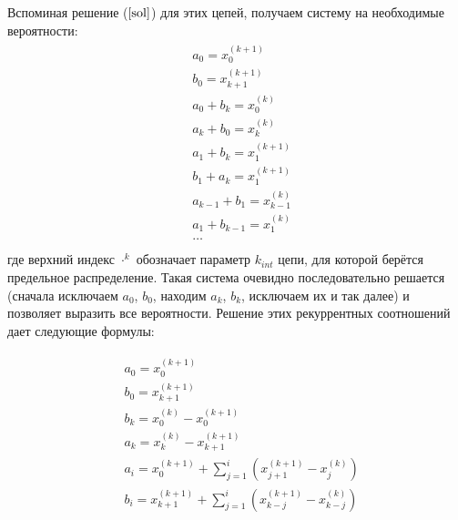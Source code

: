 Вспоминая решение ($\ref{sol}$) для этих цепей, получаем систему на необходимые вероятности:
\begin{align}
	\begin{split}
	\label{general}
	&a_0 = x^{(k+1)}_0\\
	&b_0 = x^{(k+1)}_{k+1}\\
	&a_0 + b_{k}= x^{(k)}_0\\
	&a_k + b_0 = x^{(k)}_k \\
	&a_1 + b_k = x^{(k+1)}_1\\
	&b_1 + a_k = x^{(k+1)}_1\\
	&a_{k-1} + b_1 = x^{(k)}_{k-1}\\
	&a_1+ b_{k-1} = x^{(k)}_{1}\\
	&\dots \\
	\end{split}
\end{align}
где верхний индекс $\cdot^k$ обозначает параметр $k_{int}$ цепи, для которой берётся предельное распределение. Такая система очевидно последовательно решается (сначала исключаем $a_0$, $b_0$, находим $a_k$, $b_k$, исключаем их и так далее) и позволяет выразить все вероятности.
Решение этих рекуррентных соотношений дает следующие формулы:

\begin{align}
	\begin{split}
	&a_0 = x^{(k+1)}_0\\
	&b_0 = x^{(k+1)}_{k+1}\\
	&b_{k}= x^{(k)}_0-x^{(k+1)}_0\\
	&a_k = x^{(k)}_k-x^{(k+1)}_{k+1} \\
	&a_i =x^{(k+1)}_0 + \sum_{j=1}^i (x^{(k+1)}_{j+1} - x^{(k)}_j) \\
	&b_i = x_{k+1}^{(k+1)}+\sum_{j=1}^i (x^{(k+1)}_{k-j}-x^{(k)}_{k-j})\\
	\end{split}
\end{align}

